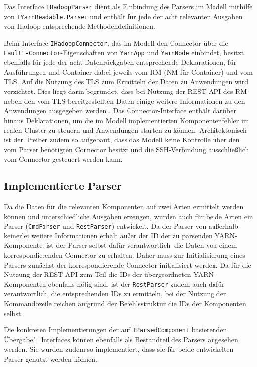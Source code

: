 Das Interface \texttt{IHadoopParser} dient als Einbindung des Parsers im Modell mithilfe von \texttt{IYarnReadable.Parser} und enthält für jede der acht relevanten Ausgaben von Hadoop entsprechende Methodendefinitionen.

Beim Interface \texttt{IHadoopConnector}, das im Modell den Connector über die \texttt{Fault"-Connector}-Eigenschaften von \texttt{YarnApp} und \texttt{YarnNode} einbindet, besitzt ebenfalls für jede der acht Datenrückgaben entsprechende Deklarationen, für Ausführungen und Container dabei jeweils vom \ac{RM} (\ac{NM} für Container) und vom \ac{TLS}. Auf die Nutzung des \ac{TLS} zum Ermitteln der Daten zu Anwendungen wird verzichtet. Dies liegt darin begründet, dass bei Nutzung der REST-API des \ac{RM} neben den vom \ac{TLS} bereitgestellten Daten einige weitere Informationen zu den Anwendungen ausgegeben werden \cite{HadoopRmApi271,HadoopYarnTlServer271}. Das Connector-Interface enthält darüber hinaus Deklarationen, um die im Modell implementierten Komponentenfehler im realen Cluster zu steuern und Anwendungen starten zu können. Architektonisch ist der Treiber zudem so aufgebaut, dass das Modell keine Kontrolle über den vom Parser benötigten Connector besitzt und die SSH-Verbindung ausschließlich vom Connector gesteuert werden kann.

\subsection{Implementierte Parser}\label{sec:implementedParsers}

Da die Daten für die relevanten Komponenten auf zwei Arten ermittelt werden können und unterschiedliche Ausgaben erzeugen, wurden auch für beide Arten ein Parser (\texttt{CmdParser} und \texttt{RestParser}) entwickelt. Da der Parser von außerhalb keinerlei weitere Informationen erhält außer der ID der zu parsenden YARN-Komponente, ist der Parser selbst dafür verantwortlich, die Daten von einem korrespondierenden Connector zu erhalten. Daher muss zur Initialisierung eines Parsers zunächst der korrespondierende Connector initialisiert werden. Da für die Nutzung der REST-API zum Teil die IDs der übergeordneten YARN-Komponenten ebenfalls nötig sind, ist der \texttt{RestParser} zudem auch dafür verantwortlich, die entsprechenden IDs zu ermitteln, bei der Nutzung der Kommandozeile reichen aufgrund der Befehlsstruktur die IDs der Komponenten selbst.

Die konkreten Implementierungen der auf \texttt{IParsedComponent} basierenden Übergabe"=Interfaces können ebenfalls als Bestandteil des Parsers angesehen werden. Sie wurden zudem so implementiert, dass sie für beide entwickelten Parser genutzt werden können.

